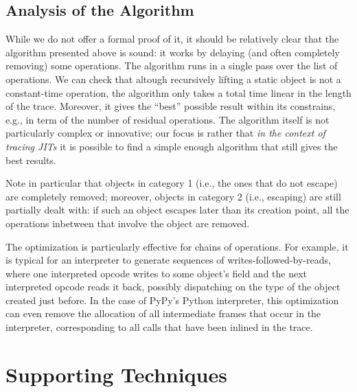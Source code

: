 \documentclass{sigplanconf}
\newcommand\ie{i.e.,\xspace}
\newcommand\eg{e.g.,\xspace}
\begin{document}

\subsection{Analysis of the Algorithm}
\label{sub:analysis}

While we do not offer a formal proof of it, it should be relatively clear
that the algorithm presented above is sound: it works by delaying (and
often completely removing) some operations.  The algorithm runs in a
single pass over the list of operations.  We can check that altough
recursively lifting a static object is not a constant-time operation,
the algorithm only takes a total time linear in the length of the trace.
Moreover, it gives the ``best'' possible result within its constrains,
\eg in term of the number of residual operations.  The
algorithm itself is not particularly complex or innovative; our focus is
rather that \emph{in the context of tracing JITs} it is possible to find a
simple enough algorithm that still gives the best results.

Note in particular that objects in category 1 (\ie the ones that do
not escape) are completely removed; moreover, objects in category 2
(\ie escaping) are still partially dealt with: if such an object
escapes later than its creation point, all the operations inbetween that
involve the object are removed.

The optimization is particularly effective for chains of operations.
For example, it is typical for an interpreter to generate sequences of
writes-followed-by-reads, where one interpreted opcode writes to some
object's field and the next interpreted opcode reads it back, possibly
dispatching on the type of the object created just before.  In the case
of PyPy's Python interpreter, this optimization can even remove the
allocation of all intermediate frames that occur in the interpreter,
corresponding to all calls that have been inlined in the trace.





\section{Supporting Techniques}
\label{sec:support}
\end{document}
